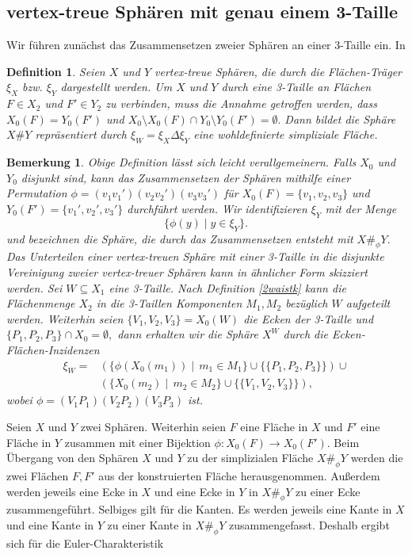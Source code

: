 \documentclass[12pt,titlepage,twoside,cleardoublepage]{article}
\theoremstyle{nummermitklammern}
\newtheorem{definition}[temp]{Definition}
\newtheorem{bemerkung}[temp]{Bemerkung}
\newtheorem{definition}[zahl]{Definition}
\newtheorem{bemerkung}[zahl]{Bemerkung}
\numberwithin{equation}{section}
\begin{document}
\subsection{vertex-treue Sphären mit genau einem 3-Taille}
Wir führen zunächst das Zusammensetzen zweier Sphären an einer 3-Taille ein. In 
\begin{definition}
Seien $X$ und $Y$ vertex-treue Sphären, die durch die Flächen-Träger $\xi_X$ bzw. $\xi_Y$ dargestellt werden. Um $X$ und $Y$ durch eine 3-Taille an Flächen $F\in X_2$ und $F'\in Y_2$ zu verbinden, muss die Annahme getroffen werden, dass
$X_0(F)=Y_0(F')$ und $X_0\setminus X_0(F)\cap Y_0\setminus Y_0(F')=\emptyset.$ Dann bildet die Sphäre $X\#Y$ repräsentiert durch $\xi_W=\xi_X \Delta \xi_Y$ eine wohldefinierte simpliziale Fläche.
\end{definition}
\begin{bemerkung}\label{3waist}
Obige Definition lässt sich leicht verallgemeinern. Falls $X_0$ und $Y_0$ disjunkt sind, kann das Zusammensetzen der Sphären mithilfe einer Permutation $\phi=(v_1v_1')(v_2v_2')(v_3v_3')$ für $X_0(F)=\{v_1,v_2,v_3\}$ und $Y_0(F')=\{v_1',v_2',v_3'\}$ durchführt werden. Wir identifizieren $\xi_Y$ mit der Menge  
\[
\{\phi (y)\mid y\in \xi_Y \}.
\]
und bezeichnen die Sphäre, die durch das Zusammensetzen  entsteht mit $X\#_{\phi}Y.$\\
Das Unterteilen einer vertex-treuen Sphäre mit einer 3-Taille in die disjunkte Vereinigung zweier vertex-treuer Sphären kann in ähnlicher Form skizziert werden. Sei $W\subseteq X_1$ eine 3-Taille. Nach Definition \ref{2waistk} kann die Flächenmenge $X_2$ in die 3-Taillen Komponenten $M_1,M_2$ bezüglich $W$ aufgeteilt werden. Weiterhin seien $\{V_1,V_2,V_3\}=X_0(W)$ die Ecken der 3-Taille und $\{P_1,P_2,P_3\}\cap X_0=\emptyset,$ dann erhalten wir die Sphäre $X^W$ durch die Ecken-Flächen-Inzidenzen 
\begin{align*}
\xi_W=&(\{\phi(X_0(m_1))\mid \, m_1\in M_1\}\cup \{\{P_1,P_2,P_3\}\}) \cup\\
 &(\{X_0(m_2)\mid \, m_2\in M_2\}\cup \{\{V_1,V_2,V_3\}\}),
\end{align*}
wobei $\phi=(V_1P_1)(V_2P_2)(V_3P_3)$ ist.
\end{bemerkung}
Seien $X$ und $Y$ zwei Sphären. Weiterhin seien  $F$ eine Fläche in $X$ und $F'$ eine Fläche in $Y$ zusammen mit einer Bijektion $\phi :X_0(F)\to X_0(F').$ Beim Übergang von den Sphären $X$ und $Y$ zu der simplizialen Fläche $X\#_\phi Y$ werden die zwei Flächen $F,F'$ aus der konstruierten Fläche herausgenommen. Außerdem werden jeweils eine Ecke in $X$ und eine Ecke in $Y$ in $X\#_\phi Y$ zu einer Ecke zusammengeführt. Selbiges gilt für die Kanten. Es werden jeweils eine Kante in $X$ und eine Kante in $Y$ zu einer Kante in $X\#_\phi Y$ zusammengefasst. Deshalb ergibt sich für die Euler-Charakteristik
\end{document}
